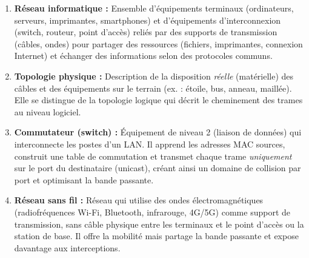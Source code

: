 \documentclass[11pt]{article}
\newcommand{\cle}[1]{{\popxbold\color{popdark}#1}}
\begin{document}
\begin{corrige}
\begin{enumerate}
  \item \textbf{\cle{Réseau informatique} :} Ensemble d'équipements terminaux (ordinateurs, serveurs, imprimantes, smartphones) et d'équipements d'interconnexion (switch, routeur, point d'accès) reliés par des supports de transmission (câbles, ondes) pour partager des ressources (fichiers, imprimantes, connexion Internet) et échanger des informations selon des protocoles communs.
  \item \textbf{\cle{Topologie physique} :} Description de la disposition \emph{réelle} (matérielle) des câbles et des équipements sur le terrain (ex. : étoile, bus, anneau, maillée). Elle se distingue de la \cle{topologie logique} qui décrit le cheminement des trames au niveau logiciel.
  \item \textbf{\cle{Commutateur} (switch) :} Équipement de niveau 2 (liaison de données) qui interconnecte les postes d'un LAN. Il apprend les adresses MAC sources, construit une table de commutation et transmet chaque trame \emph{uniquement} sur le port du destinataire (unicast), créant ainsi un domaine de collision par port et optimisant la bande passante.
  \item \textbf{\cle{Réseau sans fil} :} Réseau qui utilise des ondes électromagnétiques (radiofréquences Wi-Fi, Bluetooth, infrarouge, 4G/5G) comme support de transmission, sans câble physique entre les terminaux et le point d'accès ou la station de base. Il offre la mobilité mais partage la bande passante et expose davantage aux interceptions.
\end{enumerate}
\end{corrige}
\end{document}
